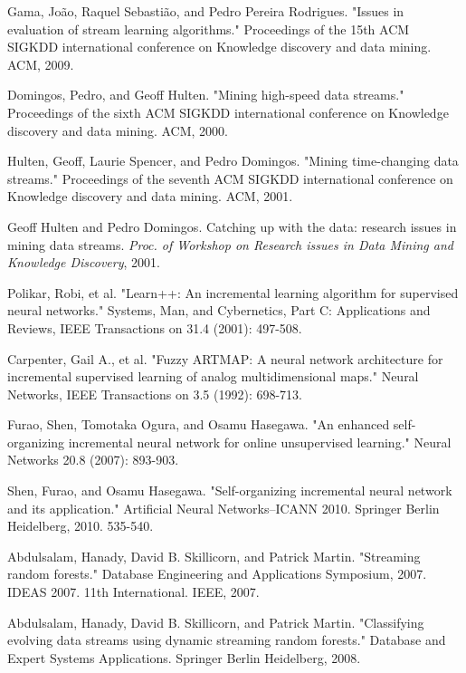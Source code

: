\documentclass[conference]{IEEEtran}
\begin{document}
\begin{thebibliography}{9}
	Gama, João, Raquel Sebastião, and Pedro Pereira  Rodrigues. "Issues in evaluation of stream learning algorithms." Proceedings of the 15th ACM SIGKDD international conference on Knowledge discovery and data mining. ACM, 2009.
	
	Domingos, Pedro, and Geoff Hulten. "Mining high-speed data streams." Proceedings of the sixth ACM SIGKDD international conference on Knowledge discovery and data mining. ACM, 2000.
	
	Hulten, Geoff, Laurie Spencer, and Pedro Domingos. "Mining time-changing data streams." Proceedings of the seventh ACM SIGKDD international conference on Knowledge discovery and data mining. ACM, 2001.
	
	Geoff Hulten and Pedro Domingos. Catching up with the data: research issues in mining data streams. \textit{Proc. of Workshop on Research issues in Data Mining and Knowledge Discovery}, 2001.
	
	Polikar, Robi, et al. "Learn++: An incremental learning algorithm for supervised neural networks." Systems, Man, and Cybernetics, Part C: Applications and Reviews, IEEE Transactions on 31.4 (2001): 497-508.
	
	Carpenter, Gail A., et al. "Fuzzy ARTMAP: A neural network architecture for incremental supervised learning of analog multidimensional maps." Neural Networks, IEEE Transactions on 3.5 (1992): 698-713.
	
	Furao, Shen, Tomotaka Ogura, and Osamu Hasegawa. "An enhanced self-organizing incremental neural network for online unsupervised learning." Neural Networks 20.8 (2007): 893-903.
	
	Shen, Furao, and Osamu Hasegawa. "Self-organizing incremental neural network and its application." Artificial Neural Networks–ICANN 2010. Springer Berlin Heidelberg, 2010. 535-540.
	
	Abdulsalam, Hanady, David B. Skillicorn, and Patrick Martin. "Streaming random forests." Database Engineering and Applications Symposium, 2007. IDEAS 2007. 11th International. IEEE, 2007.
	
	Abdulsalam, Hanady, David B. Skillicorn, and Patrick Martin. "Classifying evolving data streams using dynamic streaming random forests." Database and Expert Systems Applications. Springer Berlin Heidelberg, 2008.
	

\end{thebibliography}
\end{document}
